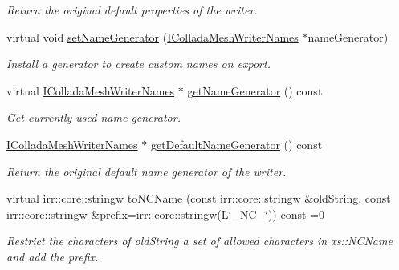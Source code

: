 \begin{DoxyCompactItemize}
\begin{DoxyCompactList}\small\item\em Return the original default properties of the writer. \end{DoxyCompactList}\item 
\mbox{\label{classirr_1_1scene_1_1IColladaMeshWriter_a7e48b43c91133e482e76da54849ef153}} 
virtual void \hyperlink{classirr_1_1scene_1_1IColladaMeshWriter_a7e48b43c91133e482e76da54849ef153}{set\+Name\+Generator} (\hyperlink{classirr_1_1scene_1_1IColladaMeshWriterNames}{I\+Collada\+Mesh\+Writer\+Names} $\ast$name\+Generator)
\begin{DoxyCompactList}\small\item\em Install a generator to create custom names on export. \end{DoxyCompactList}\item 
\mbox{\label{classirr_1_1scene_1_1IColladaMeshWriter_ad519f6ce64dcf1013b6fe0b9aaa67b40}} 
virtual \hyperlink{classirr_1_1scene_1_1IColladaMeshWriterNames}{I\+Collada\+Mesh\+Writer\+Names} $\ast$ \hyperlink{classirr_1_1scene_1_1IColladaMeshWriter_ad519f6ce64dcf1013b6fe0b9aaa67b40}{get\+Name\+Generator} () const
\begin{DoxyCompactList}\small\item\em Get currently used name generator. \end{DoxyCompactList}\item 
\hyperlink{classirr_1_1scene_1_1IColladaMeshWriterNames}{I\+Collada\+Mesh\+Writer\+Names} $\ast$ \hyperlink{classirr_1_1scene_1_1IColladaMeshWriter_acd10fcf2458271d59cf76284613288f6}{get\+Default\+Name\+Generator} () const
\begin{DoxyCompactList}\small\item\em Return the original default name generator of the writer. \end{DoxyCompactList}\item 
virtual \hyperlink{namespaceirr_1_1core_a5aedb62cb47cf01d1c548ab5e6344d2d}{irr\+::core\+::stringw} \hyperlink{classirr_1_1scene_1_1IColladaMeshWriter_ac9c48beab095aa6f4cb4f696bb2ecd45}{to\+N\+C\+Name} (const \hyperlink{namespaceirr_1_1core_a5aedb62cb47cf01d1c548ab5e6344d2d}{irr\+::core\+::stringw} \&old\+String, const \hyperlink{namespaceirr_1_1core_a5aedb62cb47cf01d1c548ab5e6344d2d}{irr\+::core\+::stringw} \&prefix=\hyperlink{namespaceirr_1_1core_a5aedb62cb47cf01d1c548ab5e6344d2d}{irr\+::core\+::stringw}(L\char`\"{}\+\_\+\+N\+C\+\_\+\char`\"{})) const =0
\begin{DoxyCompactList}\small\item\em Restrict the characters of old\+String a set of allowed characters in xs\+::\+N\+C\+Name and add the prefix. \end{DoxyCompactList}\end{DoxyCompactItemize}
